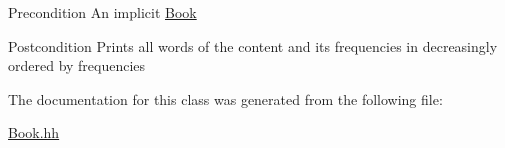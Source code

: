 \begin{DoxyPrecond}{Precondition}
An implicit \hyperlink{class_book}{Book} 
\end{DoxyPrecond}
\begin{DoxyPostcond}{Postcondition}
Prints all words of the content and its frequencies in decreasingly ordered by frequencies 
\end{DoxyPostcond}


The documentation for this class was generated from the following file\+:\begin{DoxyCompactItemize}
\item 
\hyperlink{_book_8hh}{Book.\+hh}\end{DoxyCompactItemize}
